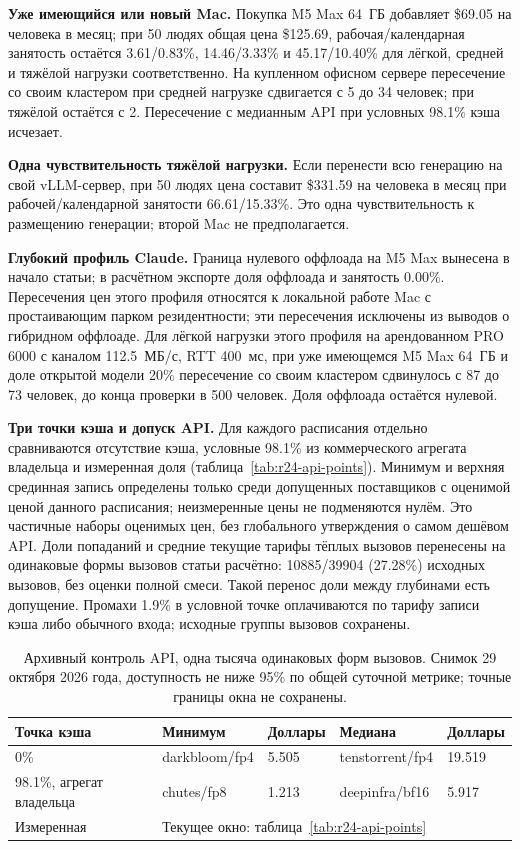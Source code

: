 \textbf{Уже имеющийся или новый Mac.} Покупка M5 Max 64~ГБ добавляет \$69.05 на человека в месяц;
при 50 людях общая цена \$125.69, рабочая/календарная занятость остаётся 3.61/0.83\%, 14.46/3.33\%
и 45.17/10.40\% для лёгкой, средней и тяжёлой нагрузки соответственно.
На купленном офисном сервере пересечение со своим кластером при средней нагрузке сдвигается с 5 до 34 человек;
при тяжёлой остаётся с 2. Пересечение с медианным API при условных 98.1\% кэша исчезает.

\textbf{Одна чувствительность тяжёлой нагрузки.} Если перенести всю генерацию на свой vLLM-сервер,
при 50 людях цена составит \$331.59 на человека в месяц при рабочей/календарной занятости 66.61/15.33\%.
Это одна чувствительность к размещению генерации; второй Mac не предполагается.

\textbf{Глубокий профиль Claude.} Граница нулевого оффлоада на M5 Max вынесена в начало статьи; в расчётном экспорте доля оффлоада и занятость 0.00\%.
Пересечения цен этого профиля относятся к локальной работе Mac с простаивающим парком резидентности;
эти пересечения исключены из выводов о гибридном оффлоаде.
Для лёгкой нагрузки этого профиля на арендованном PRO 6000 с каналом 112.5~МБ/с, RTT 400~мс,
при уже имеющемся M5 Max 64~ГБ и доле открытой модели 20\% пересечение со своим кластером
сдвинулось с 87 до 73 человек, до конца проверки в 500 человек. Доля оффлоада остаётся нулевой.

\textbf{Три точки кэша и допуск API.} Для каждого расписания отдельно сравниваются отсутствие кэша,
условные 98.1\% из коммерческого агрегата владельца и измеренная доля (таблица~\ref{tab:r24-api-points}).
Минимум и верхняя срединная запись определены только среди допущенных поставщиков с оценимой ценой данного расписания;
неизмеренные цены не подменяются нулём. Это частичные наборы оценимых цен, без глобального утверждения о самом дешёвом API.
Доли попаданий и средние текущие тарифы тёплых вызовов перенесены на одинаковые формы вызовов статьи расчётно:
10885/39904 (27.28\%) исходных вызовов, без оценки полной смеси. Такой перенос доли между глубинами есть допущение.
Промахи 1.9\% в условной точке оплачиваются по тарифу записи кэша либо обычного входа; исходные группы вызовов сохранены.

\begin{table}[t]
\centering
\caption{Архивный контроль API, одна тысяча одинаковых форм вызовов. Снимок 29 октября 2026 года,
доступность не ниже 95\% по общей суточной метрике; точные границы окна не сохранены.}
\label{tab:r22-api}
\footnotesize
\begin{tabular}{lllll}
\toprule
Точка кэша & Минимум & Доллары & Медиана & Доллары \\
\midrule
0\% & darkbloom/fp4 & 5.505 & tenstorrent/fp4 & 19.519 \\
98.1\%, агрегат владельца & chutes/fp8 & 1.213 & deepinfra/bf16 & 5.917 \\
Измеренная & \multicolumn{4}{l}{Текущее окно: таблица~\ref{tab:r24-api-points}} \\
\bottomrule
\end{tabular}
\end{table}

